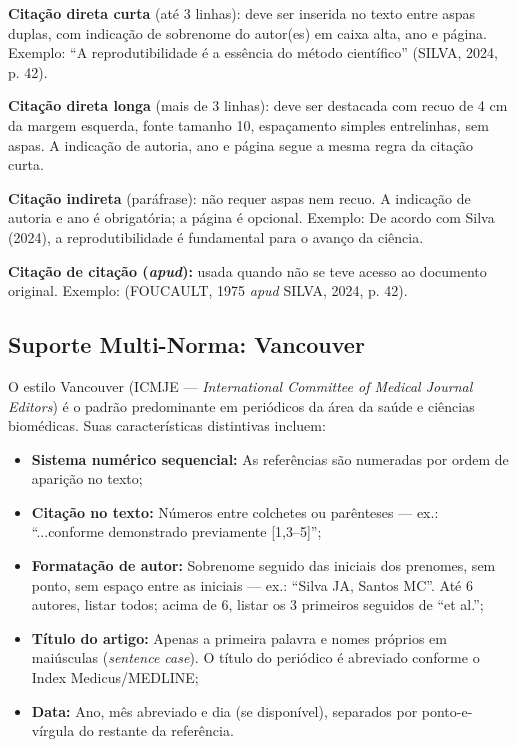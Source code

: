 \textbf{Citação direta curta} (até 3 linhas): deve ser inserida no
texto entre aspas duplas, com indicação de sobrenome do autor(es)
em caixa alta, ano e página. Exemplo: ``A reprodutibilidade é a
essência do método científico'' (SILVA, 2024, p. 42).

\textbf{Citação direta longa} (mais de 3 linhas): deve ser
destacada com recuo de 4 cm da margem esquerda, fonte tamanho 10,
espaçamento simples entrelinhas, sem aspas. A indicação de autoria,
ano e página segue a mesma regra da citação curta.

\textbf{Citação indireta} (paráfrase): não requer aspas nem recuo.
A indicação de autoria e ano é obrigatória; a página é opcional.
Exemplo: De acordo com Silva (2024), a reprodutibilidade é
fundamental para o avanço da ciência.

\textbf{Citação de citação (\textit{apud}):} usada quando não se
teve acesso ao documento original. Exemplo: (FOUCAULT, 1975
\textit{apud} SILVA, 2024, p. 42).

\subsection{Suporte Multi-Norma: Vancouver}
\label{sec:vancouver}

O estilo Vancouver (ICMJE — \textit{International Committee of
Medical Journal Editors}) é o padrão predominante em periódicos da
área da saúde e ciências biomédicas. Suas características
distintivas incluem:

\begin{itemize}
    \item \textbf{Sistema numérico sequencial:} As referências são
    numeradas por ordem de aparição no texto;

    \item \textbf{Citação no texto:} Números entre colchetes ou
    parênteses — ex.: ``...conforme demonstrado previamente
    [1,3--5]'';

    \item \textbf{Formatação de autor:} Sobrenome seguido das
    iniciais dos prenomes, sem ponto, sem espaço entre as iniciais —
    ex.: ``Silva JA, Santos MC''. Até 6 autores, listar todos;
    acima de 6, listar os 3 primeiros seguidos de ``et al.'';

    \item \textbf{Título do artigo:} Apenas a primeira palavra e
    nomes próprios em maiúsculas (\textit{sentence case}). O título
    do periódico é abreviado conforme o Index Medicus/MEDLINE;

    \item \textbf{Data:} Ano, mês abreviado e dia (se disponível),
    separados por ponto-e-vírgula do restante da referência.
\end{itemize}

